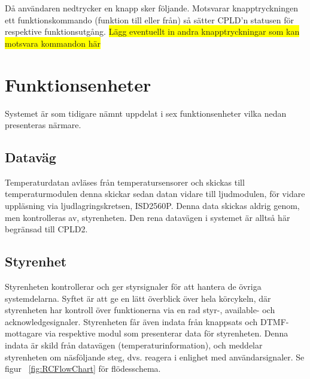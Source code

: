\documentclass[a4paper,11pt]{article}
\begin{document}
Då användaren nedtrycker en knapp sker följande. Motsvarar knapptryckningen ett funktionskommando (funktion till eller från) så sätter CPLD'n statusen för respektive funktionsutgång. \colorbox{yellow}{Lägg eventuellt in andra knapptryckningar som kan motsvara kommandon här}

\section{Funktionsenheter}
\label{sec:Funktionsenheter}
Systemet är som tidigare nämnt uppdelat i sex funktionsenheter vilka nedan presenteras närmare.

	\subsection{Dataväg}
	Temperaturdatan avläses från temperatursensorer och skickas till temperaturmodulen denna skickar sedan datan vidare till ljudmodulen, för vidare uppläsning via ljudlagringskretsen, ISD2560P. Denna data skickas aldrig genom, men kontrolleras av, styrenheten. Den rena datavägen i systemet är alltså här begränsad till CPLD2.
	
	\subsection{Styrenhet}

	Styrenheten kontrollerar och ger styrsignaler för att hantera de övriga systemdelarna. Syftet är att ge en lätt överblick över hela körcykeln, där styrenheten har kontroll över funktionerna via en rad styr-, available- och acknowledgesignaler. Styrenheten får även indata från knappsats och DTMF-mottagare via respektive modul som presenterar data för styrenheten. Denna indata är skild från datavägen (temperaturinformation), och meddelar styrenheten om näsföljande steg, dvs. reagera i enlighet med användarsignaler. Se figur ~\ref{fig:RCFlowChart} för flödesschema.
\end{document}
